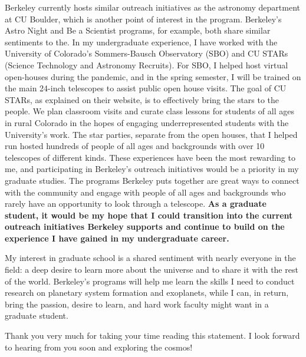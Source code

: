 \documentclass[11pt,letterpaper]{article}
\begin{document}
Berkeley currently hosts similar outreach initiatives as the astronomy department at CU Boulder, which is another point of interest in the program. Berkeley's Astro Night and Be a Scientist programs, for example,  both share similar sentiments to the. In my undergraduate experience, I have worked with the University of Colorado’s Sommers-Bausch Observatory (SBO) and CU STARs (Science Technology and Astronomy Recruits). For SBO, I helped host virtual open-houses during the pandemic, and in the spring semester, I will be trained on the main 24-inch telescopes to assist public open house visits. The goal of CU STARs, as explained on their website, is to effectively bring the stars to the people. We plan classroom visits and curate class lessons for students of all ages in rural Colorado in the hopes of engaging underrepresented students with the University's work. The star parties, separate from the open houses, that I helped run hosted hundreds of people of all ages and backgrounds with over 10 telescopes of different kinds. These experiences have been the most rewarding to me, and participating in Berkeley's outreach initiatives would be a priority in my graduate studies. The programs Berkeley puts together are great ways to connect with the community and engage with people of all ages and backgrounds who rarely have an opportunity to look through a telescope. \textbf{As a graduate student, it would be my hope that I could transition into the current outreach initiatives Berkeley supports and continue to build on the experience I have gained in my undergraduate career.}

My interest in graduate school is a shared sentiment with nearly everyone in the field: a deep desire to learn more about the universe and to share it with the rest of the world. Berkeley’s programs will help me learn the skills I need to conduct research on planetary system formation and exoplanets, while I can, in return, bring the passion, desire to learn, and hard work faculty might want in a graduate student.

Thank you very much for taking your time reading this statement. I look forward to hearing from you soon and exploring the cosmos!
\end{document}
